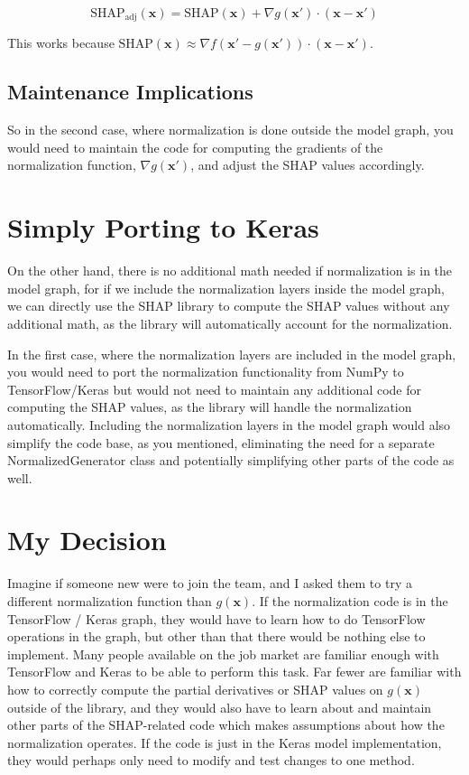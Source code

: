 \documentclass{article}
\begin{document}
\begin{equation}
    \text{SHAP}_{\text{adj}}(\mathbf{x}) = \text{SHAP}(\mathbf{x}) + \nabla g(\mathbf{x'}) \cdot (\mathbf{x} - \mathbf{x'})
\end{equation}

This works because $\text{SHAP}(\mathbf{x}) \approx \nabla f(\mathbf{x'} - g(\mathbf{x'})) \cdot (\mathbf{x} - \mathbf{x'})$.

\subsection{Maintenance Implications}

So in the second case, where normalization is done outside the model graph, you would need to maintain the code for computing the gradients of the normalization function, $\nabla g(\mathbf{x'})$, and adjust the SHAP values accordingly. 

\section{Simply Porting to Keras}

On the other hand, there is no additional math needed if normalization is in the model graph, for if we include the normalization layers inside the model graph, we can directly use the SHAP library to compute the SHAP values without any additional math, as the library will automatically account for the normalization.

In the first case, where the normalization layers are included in the model graph, you would need to port the normalization functionality from NumPy to TensorFlow/Keras but would not need to maintain any additional code for computing the SHAP values, as the library will handle the normalization automatically. Including the normalization layers in the model graph would also simplify the code base, as you mentioned, eliminating the need for a separate NormalizedGenerator class and potentially simplifying other parts of the code as well.

\section{My Decision}

Imagine if someone new were to join the team, and I asked them to try a different normalization function than $g(\mathbf{x})$. If the normalization code is in the TensorFlow / Keras graph, they would have to learn how to do TensorFlow operations in the graph, but other than that there would be nothing else to implement. Many people available on the job market are familiar enough with TensorFlow and Keras to be able to perform this task. Far fewer are familiar with how to correctly compute the partial derivatives or SHAP values on $g(\mathbf{x})$ outside of the library, and they would also have to learn about and maintain other parts of the SHAP-related code which makes assumptions about how the normalization operates. If the code is just in the Keras model implementation, they would perhaps only need to modify and test changes to one method.
\end{document}
